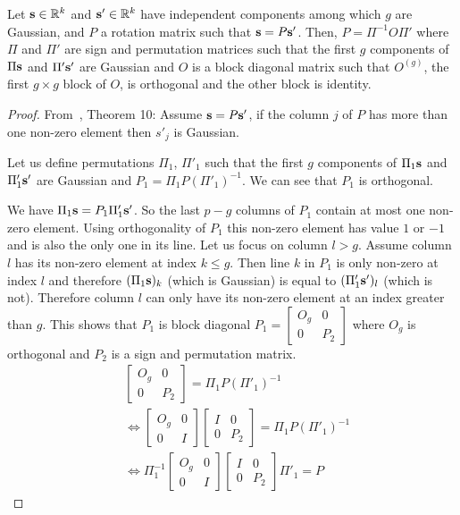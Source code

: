 \documentclass{report}
\begin{document}
\begin{lemma}
\label{lemma:ica}
Let $\mathbf{s} \in \mathbb{R}^k$ and $\mathbf{s}'\in \mathbb{R}^k$ have independent components among which $g$ are Gaussian, and $P$ a rotation matrix such that $\mathbf{s} = P\mathbf{s}'$. Then, $P=\Pi^{-1} O \Pi'$ where $\Pi$ and $\Pi'$ are sign and permutation matrices such that the first $g$ components of $\Pi \mathbf{s}$ and $\Pi' \mathbf{s}'$ are Gaussian and $O$ is a block diagonal matrix such that $O^{(g)}$, the first $g \times g$ block of $O$, is orthogonal and the other block is identity.
\end{lemma}
\begin{proof}
  From~\cite{comon1994independent}, Theorem 10:
  Assume $\mathbf{s} = P\mathbf{s}'$, if the column $j$ of $P$ has more than one non-zero element then $s'_j$ is Gaussian. 
  
  Let us define permutations $\Pi_1$, $\Pi'_1$ such that the first $g$ components of $\Pi_1 \mathbf{s}$ and $\Pi'_1 \mathbf{s}'$ are Gaussian and $P_1  = \Pi_1 P (\Pi'_1)^{-1}$. We can see that $P_1$ is orthogonal.
  
  We have $\Pi_1 \mathbf{s} = P_1 \Pi'_1 \mathbf{s}'$. So the last $p-g$ columns of $P_1$ contain at most one non-zero element. Using orthogonality of $P_1$ this non-zero element has value $1$ or $-1$ and is also the only one in its line. Let us focus on column $l > g$. Assume column $l$ has its non-zero element at index $k \leq g$. Then line $k$ in $P_1$ is only non-zero at index $l$ and therefore $(\Pi_1 \mathbf{s})_k$ (which is Gaussian) is equal to $(\Pi'_1 \mathbf{s}')_l$ (which is not). Therefore column $l$ can only have its non-zero element at an index greater than $g$. This shows that $P_1$ is block diagonal $P_1 = \begin{bmatrix} O_g & 0 \\ 0 & P_2 \end{bmatrix}$ where $O_g$ is orthogonal  and $P_2$ is a sign and permutation matrix.
  \begin{align}
      &\begin{bmatrix} O_g & 0 \\ 0 & P_2 \end{bmatrix} = \Pi_1 P (\Pi'_1)^{-1} \\
      & \iff \begin{bmatrix} O_g & 0 \\ 0 & I \end{bmatrix} \begin{bmatrix} I & 0 \\ 0 & P_2 \end{bmatrix}  = \Pi_1 P (\Pi'_1)^{-1} \\
      & \iff \Pi_1^{-1} \begin{bmatrix} O_g & 0 \\ 0 & I \end{bmatrix} \begin{bmatrix} I & 0 \\ 0 & P_2 \end{bmatrix} \Pi'_1  = P
  \end{align}
  

\end{proof}
\end{document}
